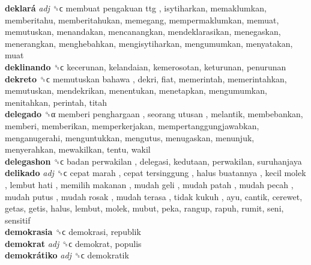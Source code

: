 \textbf{deklará} \emph{adj}  ␝ϲ   membuat pengakuan ttg , isytiharkan, memaklumkan, memberitahu, memberitahukan, memegang, mempermaklumkan, memuat, memutuskan, menandakan, mencanangkan, mendeklarasikan, menegaskan, menerangkan, menghebahkan, mengisytiharkan, mengumumkan, menyatakan, muat  \\
\textbf{deklinando} ␝ϲ  kecerunan, kelandaian, kemerosotan, keturunan, penurunan  \\
\textbf{dekreto} ␝ϲ   memutuskan bahawa , dekri, fiat, memerintah, memerintahkan, memutuskan, mendekrikan, menentukan, menetapkan, mengumumkan, menitahkan, perintah, titah  \\
\textbf{delegado} ␝α   memberi penghargaan ,  seorang utusan , melantik, membebankan, memberi, memberikan, memperkerjakan, mempertanggungjawabkan, menganugerahi, menguntukkan, mengutus, menugaskan, menunjuk, menyerahkan, mewakilkan, tentu, wakil  \\
\textbf{delegashon} ␝ϲ   badan perwakilan , delegasi, kedutaan, perwakilan, suruhanjaya  \\
\textbf{delikado} \emph{adj}  ␝ϲ   cepat marah ,  cepat tersinggung ,  halus buatannya ,  kecil molek ,  lembut hati ,  memilih makanan ,  mudah geli ,  mudah patah ,  mudah pecah ,  mudah putus ,  mudah rosak ,  mudah terasa ,  tidak kukuh , ayu, cantik, cerewet, getas, getis, halus, lembut, molek, mubut, peka, rangup, rapuh, rumit, seni, sensitif  \\
\textbf{demokrasia} ␝ϲ  demokrasi, republik  \\
\textbf{demokrat} \emph{adj}  ␝ϲ  demokrat, populis  \\
\textbf{demokrátiko} \emph{adj}  ␝ϲ  demokratik  \\
